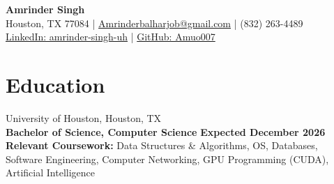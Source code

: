 \documentclass[9.5pt, letterpaper]{article}
\begin{document}
\begin{center}
    {\bf\fontsize{22pt}{22pt}\selectfont Amrinder Singh} \\[0.2cm]
    Houston, TX 77084 \quad | \quad
    \href{mailto:Amrinderbalharjob@gmail.com}{Amrinderbalharjob@gmail.com} \quad | \quad
    (832) 263-4489 \\[0.1cm]
    \href{https://www.linkedin.com/in/amrinder-singh-uh-computer-science/}{LinkedIn: amrinder-singh-uh} \quad | \quad
    \href{https://github.com/Amuo007}{GitHub: Amuo007}
\end{center}

\section{Education}
University of Houston, Houston, TX \\
\textbf{Bachelor of Science, Computer Science} \hfill \textbf{Expected December 2026} \\
\textbf{Relevant Coursework:} Data Structures \& Algorithms, OS, Databases, Software Engineering, Computer Networking, GPU Programming (CUDA), Artificial Intelligence

\end{document}
